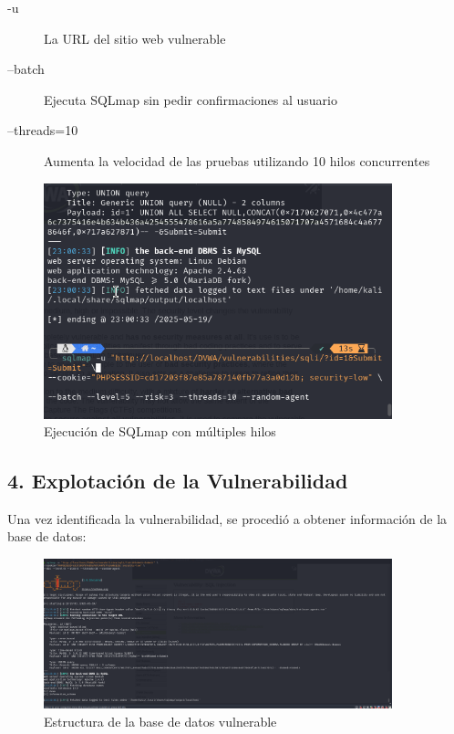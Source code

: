\documentclass[12pt,a4paper]{article}
\begin{document}
\begin{description}
    \item[-u] La URL del sitio web vulnerable
    \item[--batch] Ejecuta SQLmap sin pedir confirmaciones al usuario
    \item[--threads=10] Aumenta la velocidad de las pruebas utilizando 10 hilos concurrentes
\end{description}

\begin{figure}[H]
    \centering
    \includegraphics[width=0.9\textwidth]{sqlmap_threads.png}
    \caption{Ejecución de SQLmap con múltiples hilos}
    \label{fig:sqlmap_threads}
\end{figure}

\subsection{4. Explotación de la Vulnerabilidad}
Una vez identificada la vulnerabilidad, se procedió a obtener información de la base de datos:

\begin{figure}[H]
    \centering
    \includegraphics[width=0.9\textwidth]{database.png}
    \caption{Estructura de la base de datos vulnerable}
    \label{fig:database}
\end{figure}
\end{document}

